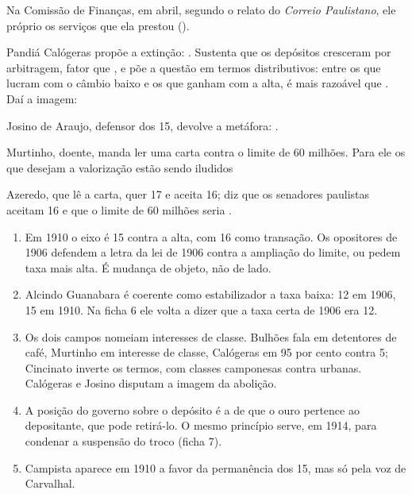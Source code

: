 
Na Comissão de Finanças, em abril, segundo o relato do \textit{Correio
Paulistano}, ele próprio  os serviços que ela prestou
().


Pandiá Calógeras propõe a extinção:  . Sustenta que os depósitos cresceram por arbitragem,
fator que  ,
e põe a questão em termos distributivos: entre os que lucram com o câmbio baixo
e os que ganham com a alta, é mais razoável que  . Daí a imagem:


Josino de Araujo, defensor dos 15, devolve a metáfora:  .


Murtinho, doente, manda ler uma carta contra o limite de 60 milhões. Para ele
os que desejam a valorização estão sendo iludidos


Azeredo, que lê a carta, quer 17 e aceita 16; diz que os senadores paulistas
aceitam 16   e que o limite de 60 milhões seria  .


\begin{enumerate}[leftmargin=*,nosep]
\item Em 1910 o eixo é 15 contra a alta, com 16 como transação. Os opositores
de 1906 defendem a letra da lei de 1906 contra a ampliação do limite, ou pedem
taxa mais alta. É mudança de objeto, não de lado.
\item Alcindo Guanabara é coerente como estabilizador a taxa baixa: 12 em
1906, 15 em 1910. Na ficha 6 ele volta a dizer que a taxa certa de 1906 era 12.
\item Os dois campos nomeiam interesses de classe. Bulhões fala em detentores
de café, Murtinho em interesse de classe, Calógeras em 95 por cento contra 5;
Cincinato inverte os termos, com classes camponesas contra urbanas. Calógeras e
Josino disputam a imagem da abolição.
\item A posição do governo sobre o depósito é a de que o ouro pertence ao
depositante, que pode retirá-lo. O mesmo princípio serve, em 1914, para
condenar a suspensão do troco (ficha 7).
\item Campista aparece em 1910 a favor da permanência dos 15, mas só pela voz
de Carvalhal.
\end{enumerate}

